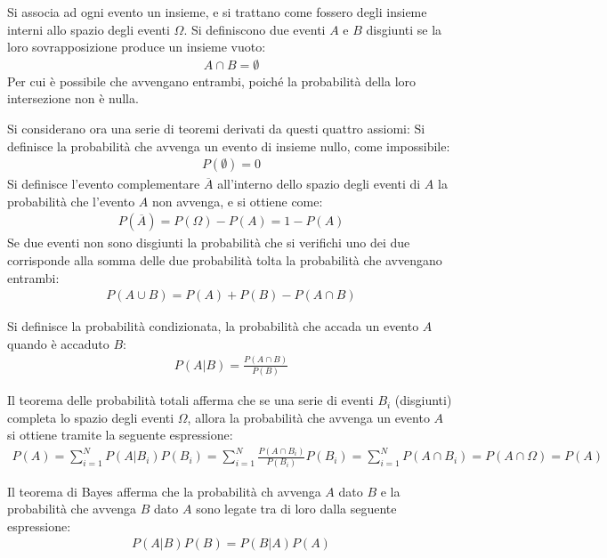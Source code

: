 \documentclass{article}
\numberwithin{equation}{subsection}
\begin{document}
Si associa ad ogni evento un insieme, e si trattano come fossero degli insieme interni allo spazio degli eventi $\Omega$. Si definiscono due eventi $A$ e $B$ disgiunti se la loro 
sovrapposizione produce un insieme vuoto:
\begin{gather*}
    A\cap B=\emptyset
\end{gather*}
Per cui è possibile che avvengano entrambi, poiché la probabilità della loro intersezione non è nulla. 


Si considerano ora una serie di teoremi derivati da questi quattro assiomi: 
Si definisce la probabilità che avvenga un evento di insieme nullo, come impossibile:
\begin{gather*}
    P(\emptyset)=0
\end{gather*}
Si definisce l'evento complementare  $\overline{A}$ all'interno dello spazio degli eventi di $A$ la probabilità che l'evento $A$ non avvenga, e si ottiene come:
\begin{gather*}
    P(\overline{A})=P(\Omega)-P(A)=1-P(A)
\end{gather*}
Se due eventi non sono disgiunti la probabilità che si verifichi uno dei due corrisponde alla somma delle due probabilità tolta la probabilità che avvengano entrambi:
\begin{gather*}
    P(A\cup B)=P(A)+P(B)-P(A\cap B)
\end{gather*}


Si definisce la probabilità condizionata, la probabilità che accada un evento $A$ quando è accaduto $B$:
\begin{gather*}
    P(A|B)=\displaystyle\frac{P(A\cap B)}{P(B)}
\end{gather*} 


Il teorema delle probabilità totali afferma che se una serie di eventi $B_i$ (disgiunti) completa lo spazio degli eventi $\Omega$, allora la probabilità 
che avvenga un evento $A$ si ottiene tramite la seguente espressione: 
\begin{gather*}
    P(A)=\displaystyle\sum_{i=1}^NP(A|B_i)P(B_i)=\sum_{i=1}^N\frac{P(A\cap B_i)}{P(B_i)}P(B_i)=\sum_{i=1}^NP(A\cap B_i)=P(A\cap \Omega)=P(A)
\end{gather*}

Il teorema di Bayes afferma che la probabilità ch avvenga $A$ dato $B$ e la probabilità che avvenga $B$ dato $A$ sono legate tra di loro dalla seguente espressione:
\begin{gather*}
    P(A|B)P(B)=P(B|A)P(A)
\end{gather*}
\end{document}
